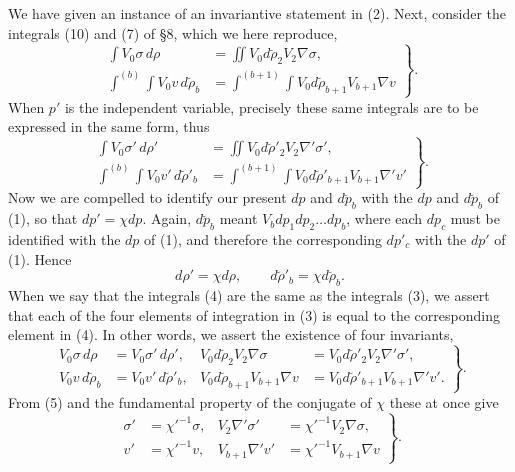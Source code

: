\documentclass[11pt]{article}
\begin{document}
\indent We have given an instance of an invariantive statement in (2). Next, consider the integrals (10) and (7) of §8, which we here reproduce,
\begin{equation}\left.\begin{aligned}\int V_0\sigma\,d\rho&=\iint V_0d\breve\rho_2V_2\nabla\sigma,\\\int^{(b)}\!\int V_0v\,d\breve\rho_b&=\int^{(b+1)}\!\int V_0d\breve\rho_{b+1}V_{b+1}\nabla v\end{aligned}\right\}.\tag{3}\end{equation}
When $p'$ is the independent variable, precisely these same integrals are to be expressed in the same form, thus
\begin{equation}\left.\begin{aligned}\int V_0\sigma'\,d\rho'&=\iint V_0d\breve\rho'_2V_2\nabla'\sigma',\\\int^{(b)}\!\int V_0v'\,d\breve\rho'_b&=\int^{(b+1)}\!\int V_0d\breve\rho'_{b+1}V_{b+1}\nabla'v'\end{aligned}\right\}.\tag{4}\end{equation}
Now we are compelled to identify our present $dp$ and $d\breve p_b$ with the $dp$ and $d\breve p_b$ of (1), so that $dp'=\chi dp$. Again, $d\breve p_b$ meant $V_bdp_1dp_2\ldots dp_b$, where each $dp_c$ must be identified with the $dp$ of (1), and therefore the corresponding $dp'_c$ with the $dp'$ of (1). Hence
\begin{equation}d\rho'=\chi d\rho,\qquad d\breve{\rho}'_b=\chi d\breve{\rho}_b.\tag{5}\end{equation}
When we say that the integrals (4) are the same as the integrals (3), we assert that each of the four elements of integration in (3) is equal to the corresponding element in (4). In other words, we assert the existence of four invariants,
\begin{equation}\left.\begin{aligned}
V_0\sigma\,d\rho&=V_0\sigma'\,d\rho',&V_0d\breve\rho_2V_2\nabla\sigma&=V_0d\breve\rho'_2V_2\nabla'\sigma',\\
V_0v\,d\breve\rho_b&=V_0v'\,d\breve\rho'_b,&V_0d\breve\rho_{b+1}V_{b+1}\nabla v&=V_0d\breve\rho'_{b+1}V_{b+1}\nabla'v'.
\end{aligned}\right\}.\tag{6}\end{equation}
From (5) and the fundamental property of the conjugate of $\chi$ these at once give
\begin{equation}\left.\begin{aligned}\sigma'&=\chi'^{-1}\sigma,&V_2\nabla'\sigma'&=\chi'^{-1}V_2\nabla\sigma,\\v'&=\chi'^{-1}v,&V_{b+1}\nabla'v'&=\chi'^{-1}V_{b+1}\nabla v\end{aligned}\right\}.\tag{7}\end{equation}
\end{document}
